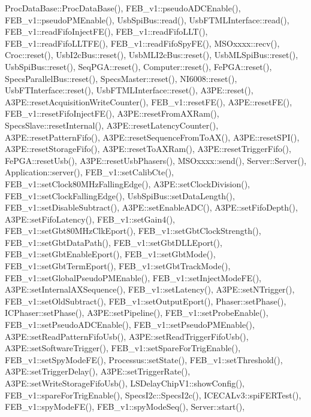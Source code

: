 Proc\+Data\+Base\+::\+Proc\+Data\+Base(), F\+E\+B\+\_\+v1\+::pseudo\+A\+D\+C\+Enable(), F\+E\+B\+\_\+v1\+::pseudo\+P\+M\+Enable(), Usb\+Spi\+Bus\+::read(), Usb\+F\+T\+M\+L\+Interface\+::read(), F\+E\+B\+\_\+v1\+::read\+Fifo\+Inject\+F\+E(), F\+E\+B\+\_\+v1\+::read\+Fifo\+L\+L\+T(), F\+E\+B\+\_\+v1\+::read\+Fifo\+L\+L\+T\+F\+E(), F\+E\+B\+\_\+v1\+::read\+Fifo\+Spy\+F\+E(), M\+S\+Oxxxx\+::recv(), Croc\+::reset(), Usb\+I2c\+Bus\+::reset(), Usb\+M\+L\+I2c\+Bus\+::reset(), Usb\+M\+L\+Spi\+Bus\+::reset(), Usb\+Spi\+Bus\+::reset(), Seq\+P\+G\+A\+::reset(), Computer\+::reset(), Fe\+P\+G\+A\+::reset(), Specs\+Parallel\+Bus\+::reset(), Specs\+Master\+::reset(), N\+I6008\+::reset(), Usb\+F\+T\+Interface\+::reset(), Usb\+F\+T\+M\+L\+Interface\+::reset(), A3\+P\+E\+::reset(), A3\+P\+E\+::reset\+Acquisition\+Write\+Counter(), F\+E\+B\+\_\+v1\+::reset\+F\+E(), A3\+P\+E\+::reset\+F\+E(), F\+E\+B\+\_\+v1\+::reset\+Fifo\+Inject\+F\+E(), A3\+P\+E\+::reset\+From\+A\+X\+Ram(), Specs\+Slave\+::reset\+Internal(), A3\+P\+E\+::reset\+Latency\+Counter(), A3\+P\+E\+::reset\+Pattern\+Fifo(), A3\+P\+E\+::reset\+Sequence\+From\+To\+A\+X(), A3\+P\+E\+::reset\+S\+P\+I(), A3\+P\+E\+::reset\+Storage\+Fifo(), A3\+P\+E\+::reset\+To\+A\+X\+Ram(), A3\+P\+E\+::reset\+Trigger\+Fifo(), Fe\+P\+G\+A\+::reset\+Usb(), A3\+P\+E\+::reset\+Usb\+Phasers(), M\+S\+Oxxxx\+::send(), Server\+::\+Server(), Application\+::server(), F\+E\+B\+\_\+v1\+::set\+Calib\+Cte(), F\+E\+B\+\_\+v1\+::set\+Clock80\+M\+Hz\+Falling\+Edge(), A3\+P\+E\+::set\+Clock\+Division(), F\+E\+B\+\_\+v1\+::set\+Clock\+Falling\+Edge(), Usb\+Spi\+Bus\+::set\+Data\+Length(), F\+E\+B\+\_\+v1\+::set\+Disable\+Subtract(), A3\+P\+E\+::set\+Enable\+A\+D\+C(), A3\+P\+E\+::set\+Fifo\+Depth(), A3\+P\+E\+::set\+Fifo\+Latency(), F\+E\+B\+\_\+v1\+::set\+Gain4(), F\+E\+B\+\_\+v1\+::set\+Gbt80\+M\+Hz\+Clk\+Eport(), F\+E\+B\+\_\+v1\+::set\+Gbt\+Clock\+Strength(), F\+E\+B\+\_\+v1\+::set\+Gbt\+Data\+Path(), F\+E\+B\+\_\+v1\+::set\+Gbt\+D\+L\+L\+Eport(), F\+E\+B\+\_\+v1\+::set\+Gbt\+Enable\+Eport(), F\+E\+B\+\_\+v1\+::set\+Gbt\+Mode(), F\+E\+B\+\_\+v1\+::set\+Gbt\+Term\+Eport(), F\+E\+B\+\_\+v1\+::set\+Gbt\+Track\+Mode(), F\+E\+B\+\_\+v1\+::set\+Global\+Pseudo\+P\+M\+Enable(), F\+E\+B\+\_\+v1\+::set\+Inject\+Mode\+F\+E(), A3\+P\+E\+::set\+Internal\+A\+X\+Sequence(), F\+E\+B\+\_\+v1\+::set\+Latency(), A3\+P\+E\+::set\+N\+Trigger(), F\+E\+B\+\_\+v1\+::set\+Old\+Subtract(), F\+E\+B\+\_\+v1\+::set\+Output\+Eport(), Phaser\+::set\+Phase(), I\+C\+Phaser\+::set\+Phase(), A3\+P\+E\+::set\+Pipeline(), F\+E\+B\+\_\+v1\+::set\+Probe\+Enable(), F\+E\+B\+\_\+v1\+::set\+Pseudo\+A\+D\+C\+Enable(), F\+E\+B\+\_\+v1\+::set\+Pseudo\+P\+M\+Enable(), A3\+P\+E\+::set\+Read\+Pattern\+Fifo\+Usb(), A3\+P\+E\+::set\+Read\+Trigger\+Fifo\+Usb(), A3\+P\+E\+::set\+Software\+Trigger(), F\+E\+B\+\_\+v1\+::set\+Spare\+For\+Trig\+Enable(), F\+E\+B\+\_\+v1\+::set\+Spy\+Mode\+F\+E(), Processus\+::set\+State(), F\+E\+B\+\_\+v1\+::set\+Threshold(), A3\+P\+E\+::set\+Trigger\+Delay(), A3\+P\+E\+::set\+Trigger\+Rate(), A3\+P\+E\+::set\+Write\+Storage\+Fifo\+Usb(), L\+S\+Delay\+Chip\+V1\+::show\+Config(), F\+E\+B\+\_\+v1\+::spare\+For\+Trig\+Enable(), Specs\+I2c\+::\+Specs\+I2c(), I\+C\+E\+C\+A\+Lv3\+::spi\+F\+E\+R\+Test(), F\+E\+B\+\_\+v1\+::spy\+Mode\+F\+E(), F\+E\+B\+\_\+v1\+::spy\+Mode\+Seq(), Server\+::start(), 